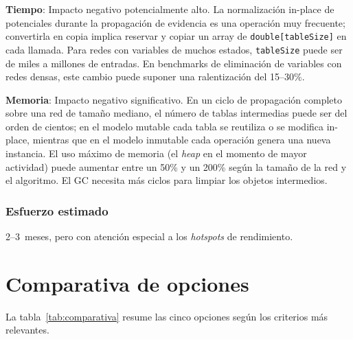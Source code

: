 \documentclass[11pt,a4paper]{article}
\newcommand{\code}[1]{\texttt{#1}}
\begin{document}
\textbf{Tiempo}: Impacto negativo potencialmente alto.  La normalización in-place
de potenciales durante la propagación de evidencia es una operación muy
frecuente; convertirla en copia implica reservar y copiar un array de
\code{double[tableSize]} en cada llamada.  Para redes con variables de muchos
estados, \code{tableSize} puede ser de miles a millones de entradas.  En
benchmarks de eliminación de variables con redes densas, este cambio puede
suponer una ralentización del 15--30\%.

\textbf{Memoria}: Impacto negativo significativo.  En un ciclo de propagación
completo sobre una red de tamaño mediano, el número de tablas intermedias puede
ser del orden de cientos; en el modelo mutable cada tabla se reutiliza o se modifica
in-place, mientras que en el modelo inmutable cada operación genera una nueva
instancia.  El uso máximo de memoria (el \emph{heap} en el momento de mayor
actividad) puede aumentar entre un 50\% y un 200\% según la tamaño de la red
y el algoritmo.  El GC necesita más ciclos para limpiar los objetos intermedios.

\subsubsection*{Esfuerzo estimado}

2--3~meses, pero con atención especial a los \emph{hotspots} de rendimiento.

\section{Comparativa de opciones}

La tabla~\ref{tab:comparativa} resume las cinco opciones según los criterios
más relevantes.
\end{document}
